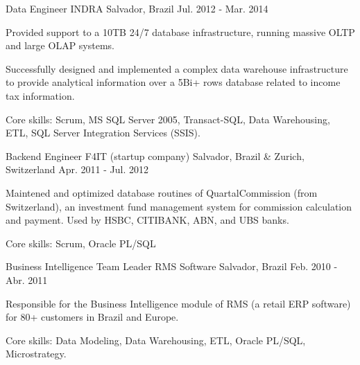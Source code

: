 \begin{cventries}

\cventry
{Data Engineer} %
{INDRA} %
{Salvador, Brazil} %
{Jul. 2012 - Mar. 2014} %
{ %
\begin{cvitems}
	\item{Provided support to a 10TB 24/7 database infrastructure, running massive OLTP and large OLAP systems.}
	\item{Successfully designed and implemented a complex data warehouse infrastructure to provide analytical information over a 5Bi+ rows database related to income tax information.}
	\item{Core skills: Scrum, MS SQL Server 2005, Transact-SQL, Data Warehousing, ETL, SQL Server Integration Services (SSIS).}
\end{cvitems} 
}


\cventry
{Backend Engineer} %
{F4IT (startup company)} %
{Salvador, Brazil \& Zurich, Switzerland} %
{Apr. 2011 - Jul. 2012} %
{ %
\begin{cvitems}
	\item{Maintened and optimized database routines of QuartalCommission (from Switzerland), an investment fund management system for commission calculation and payment. Used by HSBC, CITIBANK, ABN, and UBS banks.}
	\item{Core skills: Scrum, Oracle PL/SQL}
\end{cvitems}
}


\cventry
{Business Intelligence Team Leader} %
{RMS Software} %
{Salvador, Brazil} %
{Feb. 2010 - Abr. 2011} %
{ %
\begin{cvitems}
	\item{Responsible for the Business Intelligence module of RMS (a retail ERP software) for 80+ customers in Brazil and Europe.}
	\item{Core skills: Data Modeling, Data Warehousing, ETL, Oracle PL/SQL, Microstrategy.}
\end{cvitems}
}



\end{cventries}
